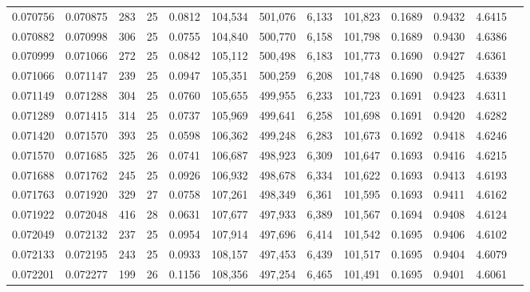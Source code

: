\begin{tabular}{rrrrrrrrrrrrr}
0.070756 & 0.070875 & 283 &  25 &                                     0.0812 & 104,534 & 501,076 &   6,133 & 101,823 & 0.1689 & 0.9432 & 4.6415 \\
0.070882 & 0.070998 & 306 &  25 &                                     0.0755 & 104,840 & 500,770 &   6,158 & 101,798 & 0.1689 & 0.9430 & 4.6386 \\
0.070999 & 0.071066 & 272 &  25 &                                     0.0842 & 105,112 & 500,498 &   6,183 & 101,773 & 0.1690 & 0.9427 & 4.6361 \\
0.071066 & 0.071147 & 239 &  25 &                                     0.0947 & 105,351 & 500,259 &   6,208 & 101,748 & 0.1690 & 0.9425 & 4.6339 \\
0.071149 & 0.071288 & 304 &  25 &                                     0.0760 & 105,655 & 499,955 &   6,233 & 101,723 & 0.1691 & 0.9423 & 4.6311 \\
0.071289 & 0.071415 & 314 &  25 &                                     0.0737 & 105,969 & 499,641 &   6,258 & 101,698 & 0.1691 & 0.9420 & 4.6282 \\
0.071420 & 0.071570 & 393 &  25 &                                     0.0598 & 106,362 & 499,248 &   6,283 & 101,673 & 0.1692 & 0.9418 & 4.6246 \\
0.071570 & 0.071685 & 325 &  26 &                                     0.0741 & 106,687 & 498,923 &   6,309 & 101,647 & 0.1693 & 0.9416 & 4.6215 \\
0.071688 & 0.071762 & 245 &  25 &                                     0.0926 & 106,932 & 498,678 &   6,334 & 101,622 & 0.1693 & 0.9413 & 4.6193 \\
0.071763 & 0.071920 & 329 &  27 &                                     0.0758 & 107,261 & 498,349 &   6,361 & 101,595 & 0.1693 & 0.9411 & 4.6162 \\
0.071922 & 0.072048 & 416 &  28 &                                     0.0631 & 107,677 & 497,933 &   6,389 & 101,567 & 0.1694 & 0.9408 & 4.6124 \\
0.072049 & 0.072132 & 237 &  25 &                                     0.0954 & 107,914 & 497,696 &   6,414 & 101,542 & 0.1695 & 0.9406 & 4.6102 \\
0.072133 & 0.072195 & 243 &  25 &                                     0.0933 & 108,157 & 497,453 &   6,439 & 101,517 & 0.1695 & 0.9404 & 4.6079 \\
0.072201 & 0.072277 & 199 &  26 &                                     0.1156 & 108,356 & 497,254 &   6,465 & 101,491 & 0.1695 & 0.9401 & 4.6061 \\

\end{tabular}
